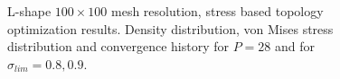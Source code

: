 \begin{figure}[h!]
 \\
     \quad
  \\
\caption{L-shape $100\times 100$ mesh resolution, stress based topology optimization results. Density distribution, von Mises stress distribution and convergence history for $P=28$ and for $\sigma_{lim}=0.8,0.9$. }%
\label{fig.2.19}%
\end{figure}
